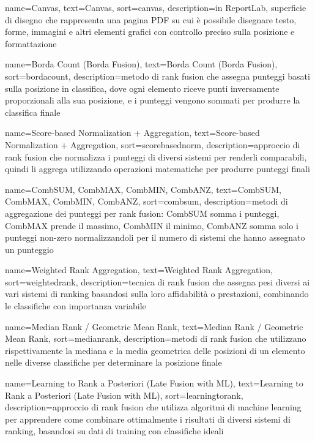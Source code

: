  {
    name=Canvas,
    text=Canvas,
    sort=canvas,
    description={in ReportLab, superficie di disegno che rappresenta una pagina PDF su cui è possibile disegnare testo, forme, immagini e altri elementi grafici con controllo preciso sulla posizione e formattazione}
}

 {
    name=Borda Count (Borda Fusion),
    text=Borda Count (Borda Fusion),
    sort=bordacount,
    description={metodo di rank fusion che assegna punteggi basati sulla posizione in classifica, dove ogni elemento riceve punti inversamente proporzionali alla sua posizione, e i punteggi vengono sommati per produrre la classifica finale}
}

 {
    name=Score-based Normalization + Aggregation,
    text=Score-based Normalization + Aggregation,
    sort=scorebasednorm,
    description={approccio di rank fusion che normalizza i punteggi di diversi sistemi per renderli comparabili, quindi li aggrega utilizzando operazioni matematiche per produrre punteggi finali}
}

 {
    name={CombSUM, CombMAX, CombMIN, CombANZ},
    text={CombSUM, CombMAX, CombMIN, CombANZ},
    sort=combsum,
    description={metodi di aggregazione dei punteggi per rank fusion: CombSUM somma i punteggi, CombMAX prende il massimo, CombMIN il minimo, CombANZ somma solo i punteggi non-zero normalizzandoli per il numero di sistemi che hanno assegnato un punteggio}
}

 {
    name=Weighted Rank Aggregation,
    text=Weighted Rank Aggregation,
    sort=weightedrank,
    description={tecnica di rank fusion che assegna pesi diversi ai vari sistemi di ranking basandosi sulla loro affidabilità o prestazioni, combinando le classifiche con importanza variabile}
}

 {
    name=Median Rank / Geometric Mean Rank,
    text=Median Rank / Geometric Mean Rank,
    sort=medianrank,
    description={metodi di rank fusion che utilizzano rispettivamente la mediana e la media geometrica delle posizioni di un elemento nelle diverse classifiche per determinare la posizione finale}
}

 {
    name=Learning to Rank a Posteriori (Late Fusion with ML),
    text=Learning to Rank a Posteriori (Late Fusion with ML),
    sort=learningtorank,
    description={approccio di rank fusion che utilizza algoritmi di machine learning per apprendere come combinare ottimalmente i risultati di diversi sistemi di ranking, basandosi su dati di training con classifiche ideali}
}

